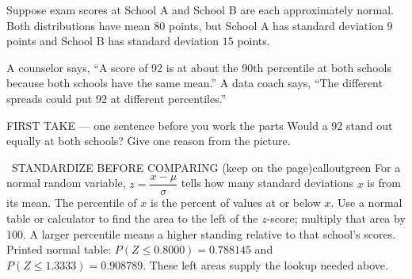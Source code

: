 \documentclass[11pt]{article}
\begin{document}


Suppose exam scores at School A and School B are each approximately normal. Both distributions have mean $80$ points, but School A has standard deviation $9$ points and School B has standard deviation $15$ points.\par\smallskip A counselor says, ``A score of 92 is at about the 90th percentile at both schools because both schools have the same mean.'' A data coach says, ``The different spreads could put 92 at different percentiles.''\par
\begin{center}
\end{center}
\begin{firsttakebox}{FIRST TAKE --- one sentence before you work the parts}
Would a 92 stand out equally at both schools? Give one reason from the picture.
\workspace{0.9in}
\end{firsttakebox}

\begin{callout}{\IconBook\ STANDARDIZE BEFORE COMPARING (keep on the page)}{calloutgreen}
For a normal random variable, $z=\dfrac{x-\mu}{\sigma}$ tells how many standard deviations $x$ is from its mean.
The percentile of $x$ is the percent of values at or below $x$.
Use a normal table or calculator to find the area to the left of the $z$-score; multiply that area by 100.
A larger percentile means a higher standing relative to that school's scores.
Printed normal table: $P(Z\leq0.8000)=0.788145$ and $P(Z\leq1.3333)=0.908789$. These left areas supply the lookup needed above.
\end{callout}
\end{document}

